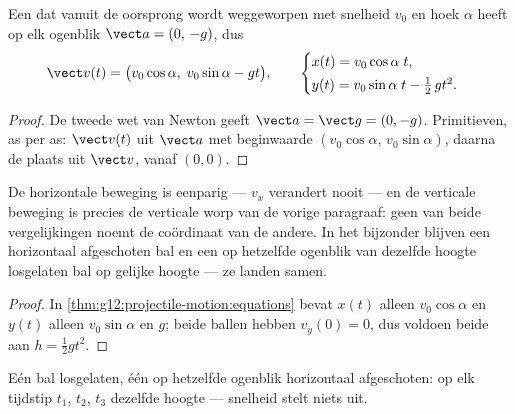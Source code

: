 \begin{theorem}[Bewegingsvergelijkingen]\label{thm:g12:projectile-motion:equations}
Een  dat vanuit de oorsprong wordt weggeworpen met snelheid $v_0$
en hoek $\alpha$ heeft op elk ogenblik $\vect a = (0,\,-g)$, dus
\[
\vect v(t) = \bigl(v_0\cos\alpha,\; v_0\sin\alpha - g t\bigr),
\qquad
\begin{cases}
x(t) = v_0\cos\alpha\; t,\\[2pt]
y(t) = v_0\sin\alpha\; t - \tfrac12\, g t^2 .
\end{cases}
\]
\end{theorem}

\begin{proof}
De tweede wet van Newton geeft $\vect a = \vect g = (0,-g)$. Primitieven, as
per as: $\vect v(t)$ uit $\vect a$ met beginwaarde
$(v_0\cos\alpha,\, v_0\sin\alpha)$, daarna de plaats uit $\vect v$, vanaf
$(0,0)$.
\end{proof}

\begin{proposition}\label{prop:g12:projectile-motion:independence}
De horizontale beweging is eenparig --- $v_x$ verandert nooit --- en de
verticale beweging is precies de verticale worp van de vorige paragraaf:
geen van beide vergelijkingen noemt de coördinaat van de andere. In het
bijzonder blijven een horizontaal afgeschoten bal en een op hetzelfde
ogenblik van dezelfde hoogte losgelaten bal op gelijke hoogte --- ze landen
samen.
\end{proposition}

\begin{proof}
In \cref{thm:g12:projectile-motion:equations} bevat $x(t)$ alleen
$v_0\cos\alpha$ en $y(t)$ alleen $v_0\sin\alpha$ en $g$; beide ballen hebben
$v_y(0) = 0$, dus voldoen beide aan $h = \tfrac12 gt^2$.
\end{proof}

\begin{omfigure}

{\small Eén bal losgelaten, één op hetzelfde ogenblik horizontaal
afgeschoten: op elk tijdstip $t_1$, $t_2$, $t_3$ dezelfde hoogte ---
snelheid stelt niets uit.}
\end{omfigure}

